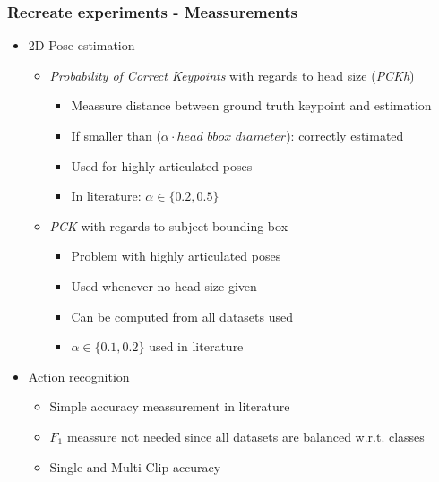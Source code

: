 \documentclass[9pt]{beamer}
\newenvironment{myframe}[1][]{%
\begin{frame}%
\frametitle{#1}
\setcounter{footnote}{0}


}{%
\end{frame}%
}
\begin{document}
\begin{myframe}[Recreate experiments - Meassurements]
    \begin{itemize}
        \item 2D Pose estimation
        \begin{itemize}
            \item \textit{Probability of Correct Keypoints} with regards to head size (\textit{PCKh})
            \begin{itemize}
                \item Meassure distance between ground truth keypoint and estimation
                \item If smaller than ($\alpha \cdot head\_bbox\_diameter$): correctly estimated
                \item Used for highly articulated poses
                \item In literature: $\alpha \in \{0.2, 0.5\}$
            \end{itemize}    
            \item \textit{PCK} with regards to subject bounding box
            \begin{itemize}
                \item Problem with highly articulated poses
                \item Used whenever no head size given
                \item Can be computed from all datasets used
                \item $\alpha \in \{0.1, 0.2\}$ used in literature
            \end{itemize}
        \end{itemize}
        \item Action recognition
        \begin{itemize}
            \item Simple accuracy meassurement in literature
            \item $F_1$ meassure not needed since all datasets are balanced w.r.t. classes
            \item Single and Multi Clip accuracy \footnotemark[1]
        \end{itemize}
    \end{itemize}
\end{myframe}
\end{document}
